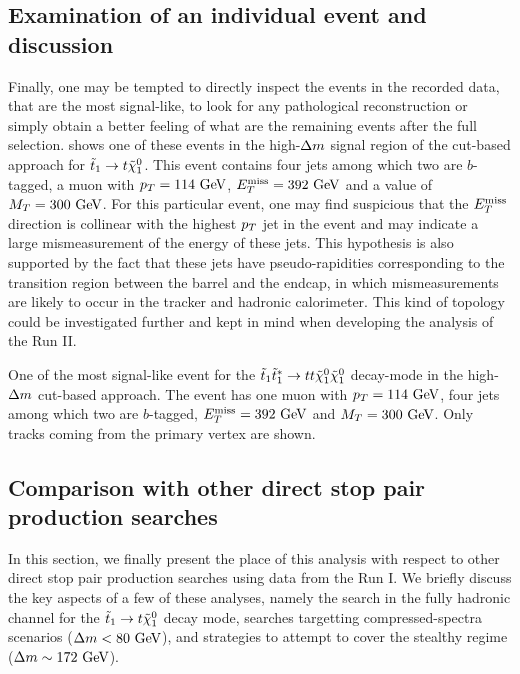     \subsection{Examination of an individual event and discussion}

    Finally, one may be tempted to directly inspect the events in the recorded data, that are the
    most signal-like, to look for any pathological reconstruction or simply obtain a
    better feeling of what are the remaining events after the full selection. 
    shows one of these events in the high-$\Delta m$ signal region of the cut-based approach
    for $\tilde{t}_1 \rightarrow t \tilde{\chi}_1^0$. This event contains four jets among which
    two are $b$-tagged, a muon with $p_T = 114~\text{GeV}$, $E_T^\text{miss} = 392~\text{GeV}$ and a value of $M_T =
    300~\text{GeV}$. For this particular event, one may find suspicious that the $E_T^\text{miss}$ direction
    is collinear with the highest $p_T$ jet in the event and may indicate a large mismeasurement
    of the energy of these jets. This hypothesis is also supported by the fact that these
    jets have pseudo-rapidities corresponding to the transition region between the barrel
    and the endcap, in which mismeasurements are likely to occur in the tracker and hadronic
    calorimeter. This kind of topology could be investigated further and kept in mind when
    developing the analysis of the Run II.

    {One of the most signal-like event for the $\tilde{t}_1 \tilde{t}_1^{*} \rightarrow t t \tilde{\chi}_1^0 \tilde{\chi}_1^0$
    decay-mode in the high-$\Delta m$ cut-based approach. The event has one muon with
    $p_T = 114~\text{GeV}$, four jets among which two are $b$-tagged, $E_T^\text{miss} = 392~\text{GeV}$ and $M_T = 300 ~\text{GeV}$.
    Only tracks coming from the primary vertex are shown.}

    \newpage

    \subsection{Comparison with other direct stop pair production searches}

    In this section, we finally present the place of this analysis with respect to other
    direct stop pair production searches using data from the Run I. We briefly discuss the
    key aspects of a few of these analyses, namely the search in the fully hadronic channel
    for the $\tilde{t}_1 \rightarrow t \tilde{\chi}_1^0$ decay mode, searches targetting
    compressed-spectra scenarios ($\Delta m < 80~\text{GeV}$), and strategies to attempt to cover
    the stealthy regime ($\Delta m \sim 172~\text{GeV}$).

